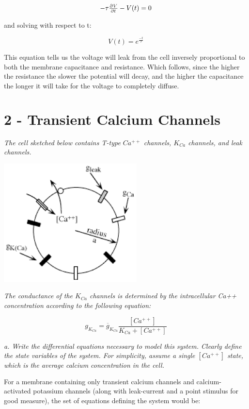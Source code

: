 \documentclass[12pt]{article}
\begin{document}
$$ -\tau\pd{V}{t}-V(t)=0 $$

\vspace{4pt}

and solving with respect to t:

$$ V(t)=e^{\frac{-t}{\tau}} $$

This equation tells us the voltage will leak from the cell inversely proportional to both the membrane capacitance and resistance.  Which follows, since the higher the resistance the slower the potential will decay, and the higher the capacitance the longer it will take for the voltage to completely diffuse.

\section{2 - Transient Calcium Channels}

\emph{The cell sketched below contains T-type $Ca^{++}$ channels, $K_{Ca}$ channels, and leak channels.} 

\includegraphics[scale=0.7]{transientcalcium.png}

\emph{The conductance of the $K_{Ca}$ channels is determined by the intracellular Ca++ concentration according to the following equation:}

$$ g_{K_{Ca}}=\overline{g}_{K_{Ca}}\frac{[Ca^{++}]}{K_{Ca}+[Ca^{++}]} $$

\emph{a.  Write the differential equations necessary to model this system. Clearly define the state variables of the system. For simplicity, assume a single $[Ca^{++}]$ state, which is the average calcium concentration in the cell.}

\vspace{10pt}

For a membrane containing only transient calcium channels and calcium-activated potassium channels (along with leak-current and a point stimulus for good measure), the set of equations defining the system would be:
\end{document}
